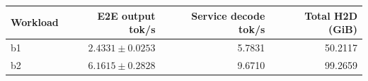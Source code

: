 \begin{tabular}{lrrr}
\toprule
Workload & E2E output tok/s & Service decode tok/s & Total H2D (GiB) \\
\midrule
b1 & $2.4331 \pm 0.0253$ & 5.7831 & 50.2117 \\
b2 & $6.1615 \pm 0.2828$ & 9.6710 & 99.2659 \\
\bottomrule
\end{tabular}
